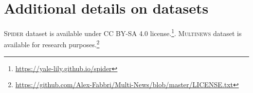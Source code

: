 
\section{Additional details on datasets}
\label{sec:appendix-data}


\textsc{Spider} dataset is available under CC BY-SA 4.0 
 license.\footnote{\url{https://yale-lily.github.io/spider}}. \textsc{Multinews} dataset is available for research purposes.\footnote{\url{https://github.com/Alex-Fabbri/Multi-News/blob/master/LICENSE.txt}}